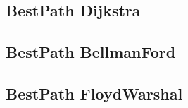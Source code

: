 \subsection{BestPath Dijkstra}
\raggedbottom
\hrulefill
\subsection{BestPath BellmanFord}
\raggedbottom
\hrulefill
\subsection{BestPath FloydWarshal}
\raggedbottom
\hrulefill

